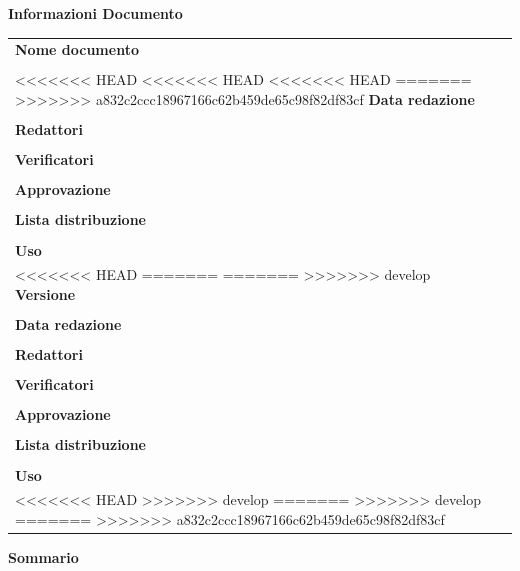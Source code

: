 \begin{center}
\vspace{1cm}
	\textbf{\Large Informazioni Documento} \\[10pt]
	\begin{longtable}{l|p{150pt}}
		\textbf{Nome documento} & \documentName \\ & \\
<<<<<<< HEAD
<<<<<<< HEAD
<<<<<<< HEAD
=======
>>>>>>> a832c2ccc18967166c62b459de65c98f82df83cf
		\textbf{Data redazione} & \documentDate \\ & \\
		\textbf{Redattori} & \parbox[t]{\linewidth}{\documentEditors} \\ & \\
		\textbf{Verificatori} & \parbox{\linewidth}{\documentVerifiers} \\ & \\
		\textbf{Approvazione} & \parbox{\linewidth}{\documentApprovers} \\ & \\
		\textbf{Lista distribuzione} & \parbox{\linewidth}{\documentDistributionList} \\ & \\
		\textbf{Uso} & \parbox{\linewidth}{\documentUsage} \\
<<<<<<< HEAD
=======
=======
>>>>>>> develop
		\textbf{Versione} & \documentVersion \\ & \\
		\textbf{Data redazione} & \documentDate \\ & \\
		\textbf{Redattori} & \parbox[t]{\textwidth}{\documentEditors} \\ & \\
		\textbf{Verificatori} & \parbox{\textwidth}{\documentVerifiers} \\ & \\
		\textbf{Approvazione} & \parbox{\textwidth}{\documentApprovers} \\ & \\
		\textbf{Lista distribuzione} & \parbox{\textwidth}{\documentDistributionList} \\ & \\
		\textbf{Uso} & \parbox{\textwidth}{\documentUsage} \\
<<<<<<< HEAD
>>>>>>> develop
=======
>>>>>>> develop
=======
>>>>>>> a832c2ccc18967166c62b459de65c98f82df83cf
	\end{longtable}
	\vspace{10pt}
	\textbf{\Large Sommario} \\
\end{center}
\documentSummary